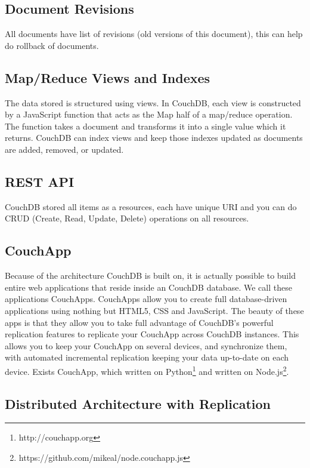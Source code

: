 \subsection{Document Revisions}

All documents have list of revisions (old versions of this document), this can help do rollback of documents.

\subsection{Map/Reduce Views and Indexes}

The data stored is structured using views. In CouchDB, each view is constructed by a JavaScript function that acts as the Map half of a map/reduce operation. The function takes a document and transforms it into a single value which it returns. CouchDB can index views and keep those indexes updated as documents are added, removed, or updated.

\subsection{REST API}

CouchDB stored all items as a resources, each have unique URI and you can do CRUD (Create, Read, Update, Delete) operations on all resources.

\subsection{CouchApp}

Because of the architecture CouchDB is built on, it is actually possible to build entire web applications that reside inside an CouchDB database. We call these applications CouchApps. CouchApps allow you to create full database-driven applications using nothing but HTML5, CSS and JavaScript. The beauty of these apps is that they allow you to take full advantage of CouchDB's powerful replication features to replicate your CouchApp across CouchDB instances. This allows you to keep your CouchApp on several devices, and synchronize them, with automated incremental replication keeping your data up-to-date on each device. Exists CouchApp, which written on Python\footnote{http://couchapp.org} and written on Node.js\footnote{https://github.com/mikeal/node.couchapp.js}.

\subsection{Distributed Architecture with Replication}

